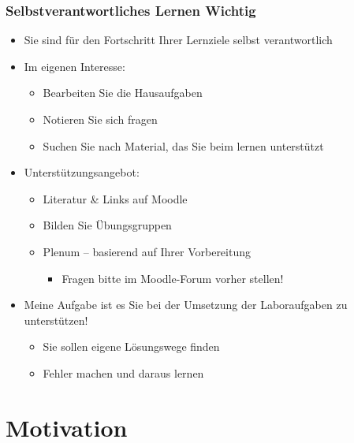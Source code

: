 \documentclass[xcolor=dvipsnames,aspectratio=169]{beamer}
\begin{document}
\begin{frame}
	\frametitle{Selbstverantwortliches Lernen \textbf{Wichtig}}
	\begin{itemize}
		\item Sie sind für den Fortschritt Ihrer Lernziele selbst verantwortlich
		\item Im eigenen Interesse:
		\begin{itemize}
			\item Bearbeiten Sie die Hausaufgaben
			\item Notieren Sie sich fragen
			\item Suchen Sie nach Material, das Sie beim lernen unterstützt
		\end{itemize}
		\item Unterstützungsangebot:
		\begin{itemize}
			\item Literatur \& Links auf Moodle
			\item Bilden Sie Übungsgruppen
			\item Plenum -- basierend auf Ihrer Vorbereitung
			\begin{itemize}
				\item Fragen bitte im Moodle-Forum vorher stellen!
			\end{itemize}
		\end{itemize}
		\item Meine Aufgabe ist es Sie bei der Umsetzung der Laboraufgaben zu unterstützen!
		\begin{itemize}
			\item Sie sollen eigene Lösungswege finden
			\item Fehler machen und daraus lernen
		\end{itemize}
	\end{itemize}
\end{frame}


\section{Motivation}
\end{document}

